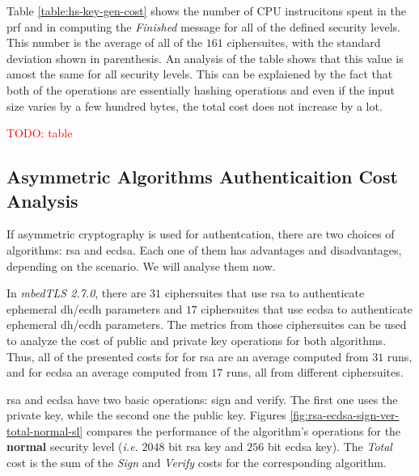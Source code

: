 \documentclass{llncs}
\newcommand{\todo}[1]{\textcolor{red}{TODO: #1}\PackageWarning{TODO:}{#1!}}
\begin{document}
Table \ref{table:hs-key-gen-cost} shows the number of CPU instrucitons spent in the \gls{prf}
and in computing the \textit{Finished} message for all of the defined security levels. 
This number is the average of all of the $161$ ciphersuites, with the standard deviation shown in parenthesis.
An analysis of the table shows that this value is amost the same for all security levels. This can be explaiened by
the fact that both of the operations are essentially hashing operations and even if the input size varies
by a few hundred bytes, the total cost does not increase by a lot.

\todo{table}

\subsection{Asymmetric Algorithms Authenticaition Cost Analysis}

If asymmetric cryptography is used for authentcation, there are two
choices of algorithms: \gls{rsa} and \gls{ecdsa}. Each one of them has advantages and disadvantages, depending on the
scenario. We will analyse them now.

In \textit{mbedTLS 2.7.0}, there are $31$ ciphersuites that use \gls{rsa} to authenticate ephemeral \gls{dh}/\gls{ecdh} parameters 
and $17$ ciphersuites that use \gls{ecdsa} to authenticate ephemeral \gls{dh}/\gls{ecdh} parameters. The metrics from those
ciphersuites can be used to analyze the cost of public and private key operations for both algorithms. Thus, all of the presented
costs for for \gls{rsa} are an average computed from $31$ runs, and for \gls{ecdsa} an average computed from $17$ runs, all from
different ciphersuites.

\gls{rsa} and \gls{ecdsa} have two basic operations: sign and verify. The first one uses the private key, while the
second one the public key. Figures \ref{fig:rsa-ecdsa-sign-ver-total-normal-sl} compares the performance of the algorithm's
operations for the \textbf{normal} security level (\textit{i.e.} $2048$ bit \gls{rsa} key and $256$ bit \gls{ecdsa} key).
The \textit{Total} cost is the sum of the \textit{Sign} and \textit{Verify} costs for the corresponding algorithm.
\end{document}
